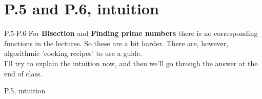 \documentclass[10pt,danish,t,10pt]{beamer}
\begin{document}
\section{P.5 and P.6, intuition}
\begin{frame}{P.5-P.6}
    For \textbf{Bisection} and \textbf{Finding prime numbers} there is no corresponding functions in the lectures. So these are a bit harder. There are, however, algorithmic 'cooking recipes' to use a guide. \\
    I'll try to explain the intuition now, and then we'll go through the answer at the end of class.
\end{frame}

\begin{frame}{P.5, intuition}
\end{frame}
\end{document}
